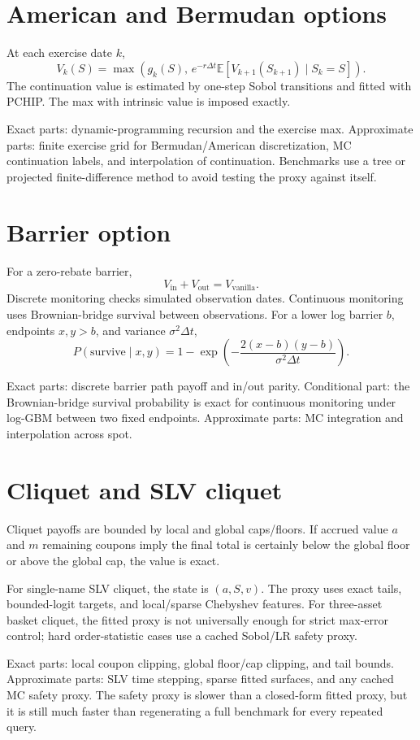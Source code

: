 \documentclass[11pt,oneside]{book}
\theoremstyle{definition}
\newcommand{\E}{\mathbb{E}}
\begin{document}
\section{American and Bermudan options}
At each exercise date \(k\),
\[
  V_k(S)=\max\!\left(g_k(S),\,e^{-r\Delta t}\E[V_{k+1}(S_{k+1})\mid S_k=S]\right).
\]
The continuation value is estimated by one-step Sobol transitions and fitted with PCHIP. The max with intrinsic value is imposed exactly.

Exact parts: dynamic-programming recursion and the exercise max. Approximate parts: finite exercise grid for Bermudan/American discretization, MC continuation labels, and interpolation of continuation. Benchmarks use a tree or projected finite-difference method to avoid testing the proxy against itself.

\section{Barrier option}
For a zero-rebate barrier,
\[
  V_{\mathrm{in}}+V_{\mathrm{out}}=V_{\mathrm{vanilla}}.
\]
Discrete monitoring checks simulated observation dates. Continuous monitoring uses Brownian-bridge survival between observations. For a lower log barrier \(b\), endpoints \(x,y>b\), and variance \(\sigma^2\Delta t\),
\[
  P(\text{survive}\mid x,y)=1-\exp\!\left(-\frac{2(x-b)(y-b)}{\sigma^2\Delta t}\right).
\]

Exact parts: discrete barrier path payoff and in/out parity. Conditional part: the Brownian-bridge survival probability is exact for continuous monitoring under log-GBM between two fixed endpoints. Approximate parts: MC integration and interpolation across spot.

\section{Cliquet and SLV cliquet}
Cliquet payoffs are bounded by local and global caps/floors. If accrued value \(a\) and \(m\) remaining coupons imply the final total is certainly below the global floor or above the global cap, the value is exact.

For single-name SLV cliquet, the state is \((a,S,v)\). The proxy uses exact tails, bounded-logit targets, and local/sparse Chebyshev features. For three-asset basket cliquet, the fitted proxy is not universally enough for strict max-error control; hard order-statistic cases use a cached Sobol/LR safety proxy.

Exact parts: local coupon clipping, global floor/cap clipping, and tail bounds. Approximate parts: SLV time stepping, sparse fitted surfaces, and any cached MC safety proxy. The safety proxy is slower than a closed-form fitted proxy, but it is still much faster than regenerating a full benchmark for every repeated query.
\end{document}
